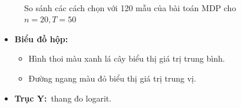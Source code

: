 \documentclass[../main.tex]{subfiles}
\begin{document}
\begin{figure}
  \centering
  \\

  \caption{So sánh các cách chọn với 120 mẫu của bài toán MDP cho \(n=20, T=50\)}
  \label{fig:12}
\end{figure}

\begin{itemize}
\tightlist
\item
  \textbf{Biểu đồ hộp:}

  \begin{itemize}
  \tightlist
  \item
    Hình thoi màu xanh lá cây biểu thị giá trị trung bình.
  \item
    Đường ngang màu đỏ biểu thị giá trị trung vị.
  \end{itemize}
\item
  \textbf{Trục Y:}~thang đo logarit.
\end{itemize}
\end{document}
